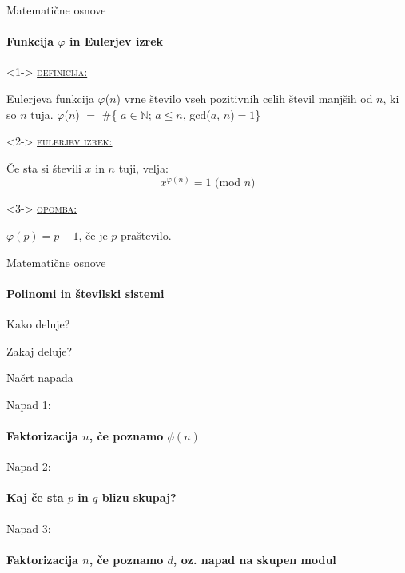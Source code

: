 \documentclass[a4paper, 12pt]{beamer} %
\newenvironment{matematika}[1]{
\textcolor{bostonuniversityred}{\underline{\textsc{#1:}}}
}{
}
\begin{document}
\begin{frame}{Matematične osnove}
\framesubtitle{Funkcija $\varphi$ in Eulerjev izrek}
\begin{block}<1->{}
\begin{matematika}{definicija}
Eulerjeva funkcija $\varphi$($n$) vrne število vseh pozitivnih celih števil manjših od $n$, ki so $n$ tuja.
\newline
\newline
$\varphi$($n$) $=$ \#\{ $a \in \mathbb{N}$; $a \leq n$, gcd($a$, $n$)$=1$\}
\end{matematika}
\end{block}

\begin{block}<2->{}
\begin{matematika}{eulerjev izrek}
Če sta si števili $x$ in $n$ tuji, velja:
\[
x^{\varphi(n)} = 1 \text{ (mod }n)
\]
\end{matematika}
\end{block}

\begin{block}<3->{}
\begin{matematika}{opomba}
$\varphi(p) = p-1$, če je $p$ praštevilo.
\end{matematika}
\end{block}
\end{frame}

\begin{frame}{Matematične osnove}
\framesubtitle{Polinomi in številski sistemi}
\end{frame}

\begin{frame}{Kako deluje?}
\end{frame}

\begin{frame}{Zakaj deluje?}
\end{frame}

\begin{frame}{Načrt napada}
\end{frame}

\begin{frame}{Napad 1:}
\framesubtitle{Faktorizacija $n$, če poznamo $\phi(n)$}
\end{frame}

\begin{frame}{Napad 2:}
\framesubtitle{Kaj če sta $p$ in $q$ blizu skupaj?}
\end{frame}

\begin{frame}{Napad 3:}
\framesubtitle{Faktorizacija $n$, če poznamo $d$, oz. napad na skupen modul}
\end{frame}
\end{document}
